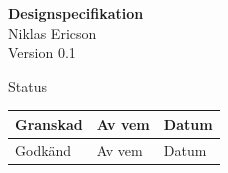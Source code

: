 \documentclass[a4paper,12pt,fleqn]{article}
\begin{document}
	\pagestyle{fancy}
	\vspace*{\fill}
		\begingroup
			\begin{center}
				\huge{\textbf{Designspecifikation}}
				\\
				\normalsize
				Niklas Ericson
				\\
				Version 0.1
				\end{center}
		\endgroup
	\vspace*{\fill}
	
	
	\begin{center} %
		Status
		\\
		\vspace{3pt} %
	    \begin{tabular}{| p{3cm} | p{3cm} | p{3cm} |} %
	    \hline %
	    Granskad & Av vem & Datum \\ \hline %
		Godkänd & Av vem & Datum \\ \hline %

	    \end{tabular}
	\end{center}
	\vspace{2cm}
	\newpage
	
\end{document}
